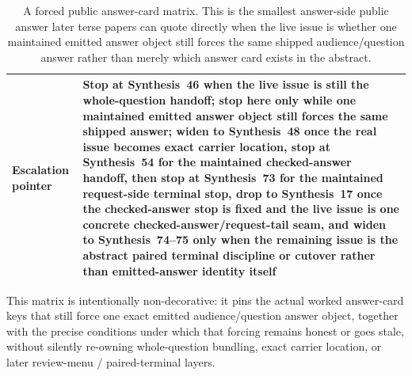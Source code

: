 \documentclass[11pt]{article}
\begin{document}
\begin{table}[t]
\begin{tabularx}{\linewidth}{@{}lX@{}}
Escalation pointer & Stop at Synthesis~46 when the live issue is still the whole-question handoff; stop here only while one maintained emitted answer object still forces the same shipped answer; widen to Synthesis~48 once the real issue becomes exact carrier location, stop at Synthesis~54 for the maintained checked-answer handoff, then stop at Synthesis~73 for the maintained request-side terminal stop, drop to Synthesis~17 once the checked-answer stop is fixed and the live issue is one concrete checked-answer/request-tail seam, and widen to Synthesis~74--75 only when the remaining issue is the abstract paired terminal discipline or cutover rather than emitted-answer identity itself \\
\bottomrule
\end{tabularx}
\caption{A forced public answer-card matrix. This is the smallest answer-side public answer later terse papers can quote directly when the live issue is whether one maintained emitted answer object still forces the same shipped audience/question answer rather than merely which answer card exists in the abstract.}
\label{tab:forced-public-answer-card-matrix}
\end{table}

This matrix is intentionally non-decorative: it pins the actual worked answer-card keys that still force one exact emitted audience/question answer object, together with the precise conditions under which that forcing remains honest or goes stale, without silently re-owning whole-question bundling, exact carrier location, or later review-menu / paired-terminal layers.\cite{series:workedexample}
\end{document}
